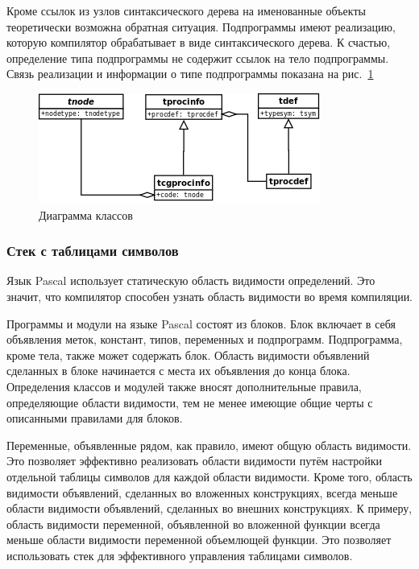 \documentclass{imcs}
\begin{document}
Кроме ссылок из узлов синтаксического дерева на именованные объекты теоретически возможна обратная
ситуация. Подпрограммы имеют реализацию, которую компилятор обрабатывает в виде синтаксического
дерева. К счастью, определение типа подпрограммы не содержит ссылок на тело подпрограммы. Связь
реализации и информации о типе подпрограммы показана на рис.~\ref{tprocinfo}

\begin{figure}[htb]
\centering
\includegraphics{./uml/tprocinfo.png}
\caption{Диаграмма классов}
\label{tprocinfo}
\end{figure}

\subsubsection{Стек с таблицами символов}

Язык Pascal использует статическую область видимости определений. Это значит, что компилятор
способен узнать область видимости во время компиляции.

Программы и модули на языке Pascal состоят из блоков.
Блок включает в себя объявления меток, констант, типов, переменных и подпрограмм.
Подпрограмма, кроме тела, также может содержать блок. Область видимости объявлений сделанных в блоке
начинается с места их объявления до конца блока\cite{refguide}.
Определения классов и модулей также вносят дополнительные
правила, определяющие области видимости, тем не менее имеющие общие черты с описанными правилами для блоков.

Переменные, объявленные рядом, как правило, имеют общую область видимости. 
Это позволяет эффективно реализовать области видимости
путём настройки отдельной таблицы символов для каждой области видимости\cite{dragonbook}. 
Кроме того, область видимости
объявлений, сделанных во вложенных конструкциях, всегда меньше области видимости объявлений, сделанных
во внешних конструкциях. К примеру, область видимости переменной, объявленной во вложенной функции 
всегда меньше области видимости переменной объемлющей функции. Это позволяет использовать стек для
эффективного управления таблицами символов. 
\end{document}

